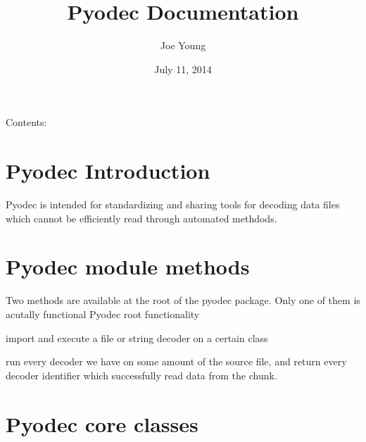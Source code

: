 \documentclass[letterpaper,10pt,english]{sphinxmanual}
\title{Pyodec Documentation}
\date{July 11, 2014}
\author{Joe Young}
\begin{document}
\maketitle
\tableofcontents
{}\label{index::doc}


Contents:


\chapter{Pyodec Introduction}
\label{intro::doc}\label{intro:pyodec-introduction}\label{intro:welcome-to-pyodec-s-documentation}
Pyodec is intended for standardizing and sharing tools for decoding data files which cannot be efficiently read through automated methdods.


\chapter{Pyodec module methods}
\label{root::doc}\label{root:pyodec-module-methods}
Two methods are available at the root of the pyodec package. Only one of them is acutally functional
\label{root:module-pyodec}
Pyodec root functionality

\begin{fulllineitems}
\label{root:pyodec.decode}
import and execute a file or string decoder on a certain class

\end{fulllineitems}


\begin{fulllineitems}
\label{root:pyodec.detect}
run every decoder we have on some amount of the source file, 
and return every decoder identifier which successfully read data from the chunk.

\end{fulllineitems}



\chapter{Pyodec core classes}
\label{classes:pyodec-core-classes}\label{classes:module-pyodec.core}\label{classes::doc}
\end{document}

